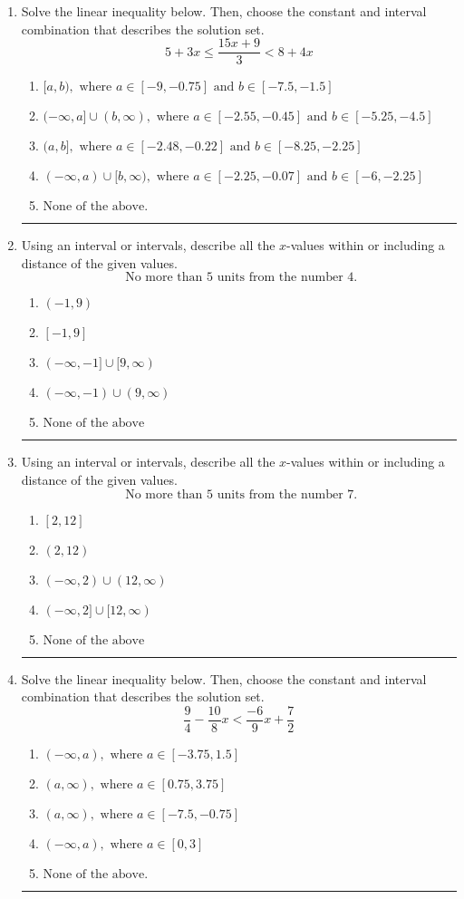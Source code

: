 \documentclass[14pt]{extbook}
\newcommand{\litem}[1]{\item#1\hspace*{-1cm}\rule{\textwidth}{0.4pt}}
\begin{document}
\begin{enumerate}
{\begin{enumerate}[label=\Alph*.]
\end{enumerate} }
\litem{
Solve the linear inequality below. Then, choose the constant and interval combination that describes the solution set.\[ 5 + 3 x \leq \frac{15 x + 9}{3} < 8 + 4 x \]\begin{enumerate}[label=\Alph*.]
\item \( [a, b), \text{ where } a \in [-9, -0.75] \text{ and } b \in [-7.5, -1.5] \)
\item \( (-\infty, a] \cup (b, \infty), \text{ where } a \in [-2.55, -0.45] \text{ and } b \in [-5.25, -4.5] \)
\item \( (a, b], \text{ where } a \in [-2.48, -0.22] \text{ and } b \in [-8.25, -2.25] \)
\item \( (-\infty, a) \cup [b, \infty), \text{ where } a \in [-2.25, -0.07] \text{ and } b \in [-6, -2.25] \)
\item \( \text{None of the above.} \)

\end{enumerate} }
\litem{
Using an interval or intervals, describe all the $x$-values within or including a distance of the given values.\[ \text{ No more than } 5 \text{ units from the number } 4. \]\begin{enumerate}[label=\Alph*.]
\item \( (-1, 9) \)
\item \( [-1, 9] \)
\item \( (-\infty, -1] \cup [9, \infty) \)
\item \( (-\infty, -1) \cup (9, \infty) \)
\item \( \text{None of the above} \)

\end{enumerate} }
\litem{
Using an interval or intervals, describe all the $x$-values within or including a distance of the given values.\[ \text{ No more than } 5 \text{ units from the number } 7. \]\begin{enumerate}[label=\Alph*.]
\item \( [2, 12] \)
\item \( (2, 12) \)
\item \( (-\infty, 2) \cup (12, \infty) \)
\item \( (-\infty, 2] \cup [12, \infty) \)
\item \( \text{None of the above} \)

\end{enumerate} }
\litem{
Solve the linear inequality below. Then, choose the constant and interval combination that describes the solution set.\[ \frac{9}{4} - \frac{10}{8} x < \frac{-6}{9} x + \frac{7}{2} \]\begin{enumerate}[label=\Alph*.]
\item \( (-\infty, a), \text{ where } a \in [-3.75, 1.5] \)
\item \( (a, \infty), \text{ where } a \in [0.75, 3.75] \)
\item \( (a, \infty), \text{ where } a \in [-7.5, -0.75] \)
\item \( (-\infty, a), \text{ where } a \in [0, 3] \)
\item \( \text{None of the above}. \)


\end{enumerate}}
\end{enumerate}
\end{document}
